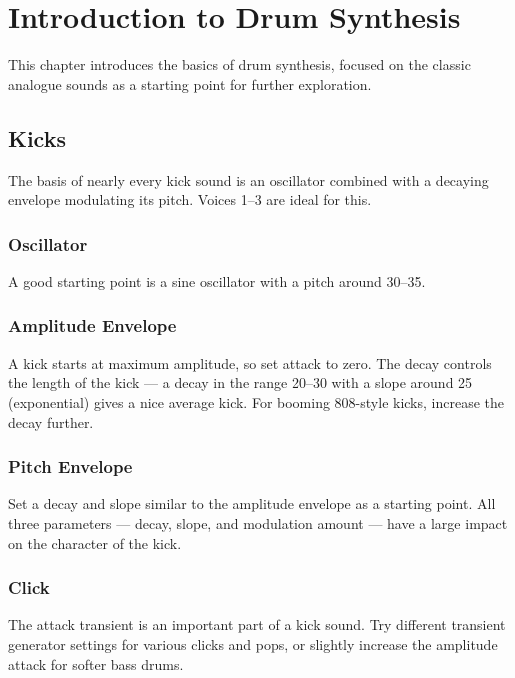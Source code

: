 \section{Introduction to Drum
Synthesis}\label{introduction-to-drum-synthesis}

This chapter introduces the basics of drum synthesis, focused on the
classic analogue sounds as a starting point for further exploration.

\subsection{Kicks}\label{kicks}

The basis of nearly every kick sound is an oscillator combined with a
decaying envelope modulating its pitch. Voices 1--3 are ideal for this.

\subsubsection{Oscillator}\label{oscillator}

A good starting point is a sine oscillator with a pitch around 30--35.

\subsubsection{Amplitude Envelope}\label{amplitude-envelope}

A kick starts at maximum amplitude, so set attack to zero. The decay
controls the length of the kick --- a decay in the range 20--30 with a
slope around 25 (exponential) gives a nice average kick. For booming
808-style kicks, increase the decay further.

\subsubsection{Pitch Envelope}\label{pitch-envelope}

Set a decay and slope similar to the amplitude envelope as a starting
point. All three parameters --- decay, slope, and modulation amount ---
have a large impact on the character of the kick.

\subsubsection{Click}\label{click}

The attack transient is an important part of a kick sound. Try different
transient generator settings for various clicks and pops, or slightly
increase the amplitude attack for softer bass drums.

